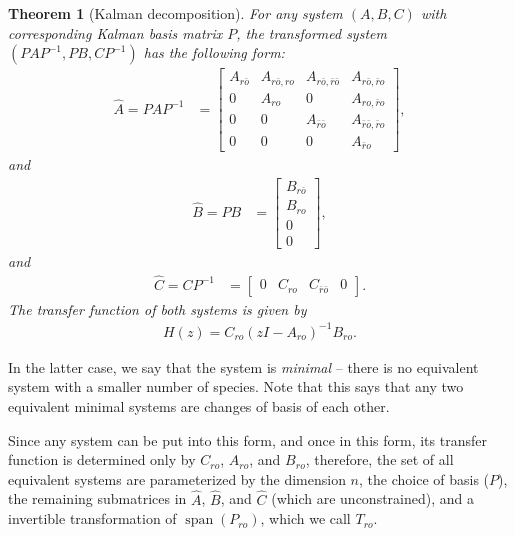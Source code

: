 \documentclass{article}
\newcommand{\ro}{{ro}}
\newcommand{\nro}{{\bar{r}o}}
\newcommand{\rno}{{r\bar{o}}}
\newcommand{\nrno}{{\bar{r}\bar{o}}}
\newcommand{\1}{\mathbbm{1}}
\DeclareMathOperator{\spn}{span}
\newtheorem{theorem}{Theorem}
\begin{document}
\begin{theorem}[Kalman decomposition] \label{thm:kalman}
        For any system $(A,B,C)$ with corresponding Kalman basis matrix $P$,
        the transformed system $(PAP^{-1},PB,CP^{-1})$  has the following form:
        \begin{align*}
            \widehat A = PAP^{-1}
            &=
            \left[ \begin{array}{cccc}
                A_{\rno} & A_{\rno,\ro} & A_{\rno,\nrno} & A_{\rno,\nro} \\
                0 & A_{\ro} & 0 & A_{\ro,\nro} \\
                0 & 0 & A_{\nrno} & A_{\nrno,\nro} \\
                0 & 0 & 0 & A_{\nro}
            \end{array} \right] ,
        \end{align*}
        and
        \begin{align*}
            \widehat B = PB
            &=
            \left[ \begin{array}{cccc}
                B_{\rno} \\
                B_{\ro} \\
                0 \\
                0 
            \end{array} \right] ,
        \end{align*}
        and
        \begin{align*}
            \widehat C = CP^{-1}
            &=
            \left[ \begin{array}{cccc}
                0 & C_{\ro} & C_{\nrno} & 0 
            \end{array} \right] .
        \end{align*}
        The transfer function of both systems is given by
        \begin{align*}
            H(z) = C_{\ro} ( zI - A_{\ro} )^{-1} B_{\ro} .
        \end{align*}
\end{theorem}

In the latter case, we say that the system is \emph{minimal} 
-- there is no equivalent system with a smaller number of species.
Note that this says that any two equivalent minimal systems
are changes of basis of each other.

Since any system can be put into this form,
and once in this form, its transfer function is determined only by 
$C_{\ro}$, $A_{\ro}$, and $B_\ro$,
therefore, the set of all equivalent systems are parameterized by
the dimension $n$,
the choice of basis ($P$),
the remaining submatrices in $\widehat A$, $\widehat B$, and $\widehat C$
(which are unconstrained),
and a invertible transformation of $\spn(P_{\ro})$, which we call $T_\ro$.
\end{document}
